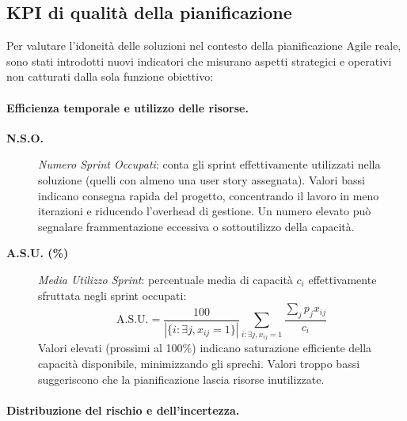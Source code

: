 \documentclass[12pt,a4paper,openright,twoside]{book}
\begin{document}
\subsection{KPI di qualità della pianificazione}

Per valutare l'idoneità delle soluzioni nel contesto della pianificazione Agile reale, sono stati introdotti nuovi indicatori che misurano aspetti strategici e operativi non catturati dalla sola funzione obiettivo:

\paragraph{Efficienza temporale e utilizzo delle risorse.}

\begin{description}
    \item[\textbf{N.S.O.}] \emph{Numero Sprint Occupati}: conta gli sprint effettivamente utilizzati nella soluzione (quelli con almeno una user story assegnata). Valori bassi indicano consegna rapida del progetto, concentrando il lavoro in meno iterazioni e riducendo l'overhead di gestione. Un numero elevato può segnalare frammentazione eccessiva o sottoutilizzo della capacità.
    
    \item[\textbf{A.S.U. (\%)}] \emph{Media Utilizzo Sprint}: percentuale media di capacità $c_i$ effettivamente sfruttata negli sprint occupati:
    \[
    \text{A.S.U.} = \frac{100}{|\{i : \exists j, x_{ij} = 1\}|} \sum_{i : \exists j, x_{ij} = 1} \frac{\sum_j p_j x_{ij}}{c_i}
    \]
    Valori elevati (prossimi al 100\%) indicano saturazione efficiente della capacità disponibile, minimizzando gli sprechi. Valori troppo bassi suggeriscono che la pianificazione lascia risorse inutilizzate.
\end{description}

\paragraph{Distribuzione del rischio e dell'incertezza.}
\end{document}
